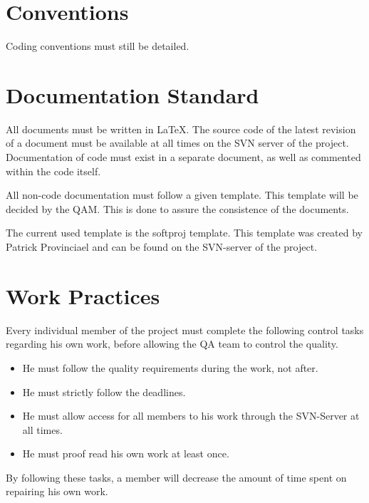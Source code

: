 \documentclass[salesmen, twoside]{softproj}
\begin{document}
\begin{projdoc}
\section{Conventions}
Coding conventions must still be detailed.

\section{Documentation Standard}
All documents must be written in LaTeX. The source code of the latest revision of a document must be available at all times on the SVN server of the project. Documentation of code must exist in a separate document, as well as commented within the code itself.

All non-code documentation must follow a given template. This template will be decided by the QAM. This is done to assure the consistence of the documents.

The current used template is the softproj template. This template was created by Patrick Provinciael and can be found on the SVN-server of the project.

\section{Work Practices}
Every individual member of the project must complete the following control tasks regarding his own work, before allowing the QA team to control the quality.
\begin{itemize}
\item He must follow the quality requirements during the work, not after.
\item He must strictly follow the deadlines.
\item He must allow access for all members to his work through the SVN-Server at all times.
\item He must proof read his own work at least once.
\end{itemize}
By following these tasks, a member will decrease the amount of time spent on repairing his own work.


\end{projdoc}
\end{document}

